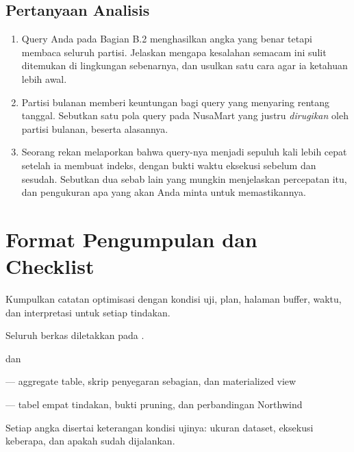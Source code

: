 \subsection{Pertanyaan Analisis}

\begin{enumerate}[leftmargin=1.4em]
  \item Query Anda pada Bagian B.2 menghasilkan angka yang benar tetapi membaca
        seluruh partisi. Jelaskan mengapa kesalahan semacam ini sulit
        ditemukan di lingkungan sebenarnya, dan usulkan satu cara agar ia
        ketahuan lebih awal.
  \item Partisi bulanan memberi keuntungan bagi query yang menyaring rentang
        tanggal. Sebutkan satu pola query pada NusaMart yang justru
        \emph{dirugikan} oleh partisi bulanan, beserta alasannya.
  \item Seorang rekan melaporkan bahwa query-nya menjadi sepuluh kali lebih
        cepat setelah ia membuat indeks, dengan bukti waktu eksekusi sebelum
        dan sesudah. Sebutkan dua sebab lain yang mungkin menjelaskan
        percepatan itu, dan pengukuran apa yang akan Anda minta untuk
        memastikannya.
\end{enumerate}

\section{Format Pengumpulan dan Checklist}

Kumpulkan catatan optimisasi dengan kondisi uji, plan, halaman buffer, waktu,
dan interpretasi untuk setiap tindakan.

Seluruh berkas diletakkan pada .

\begin{ceklis}
  \item {} dan 
  \item {}
  \item {} --- aggregate table, skrip penyegaran
        sebagian, dan materialized view
  \item {} --- tabel empat tindakan, bukti pruning,
        dan perbandingan Northwind
  \item {}
  \item {}
  \item Setiap angka disertai keterangan kondisi ujinya: ukuran dataset,
        eksekusi keberapa, dan apakah  sudah dijalankan.
\end{ceklis}


